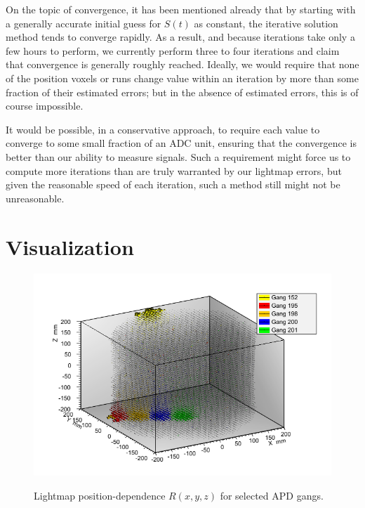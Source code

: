On the topic of convergence, it has been mentioned already that by starting with a generally accurate initial guess for $S(t)$ as constant, the iterative solution method tends to converge rapidly.  As a result, and because iterations take only a few hours to perform, we currently perform three to four iterations and claim that convergence is generally roughly reached.  Ideally, we would require that none of the position voxels or runs change value within an iteration by more than some fraction of their estimated errors; but in the absence of estimated errors, this is of course impossible.

It would be possible, in a conservative approach, to require each value to converge to some small fraction of an ADC unit, ensuring that the convergence is better than our ability to measure signals.  Such a requirement might force us to compute more iterations than are truly warranted by our lightmap errors, but given the reasonable speed of each iteration, such a method still might not be unreasonable.  


\section{Visualization} \label{sec:LightmapVisualization}

\begin{figure}
\begin{center}
\includegraphics[keepaspectratio=true,width=\textwidth]{Lightmap_viz.png}
\end{center}
\renewcommand{\baselinestretch}{1}
\small\normalsize
\begin{quote}
\caption{Lightmap position-dependence $R(x,y,z)$ for selected APD gangs.}
\label{fig1.1}
\end{quote}
\end{figure}
\renewcommand{\baselinestretch}{2}
\small\normalsize

